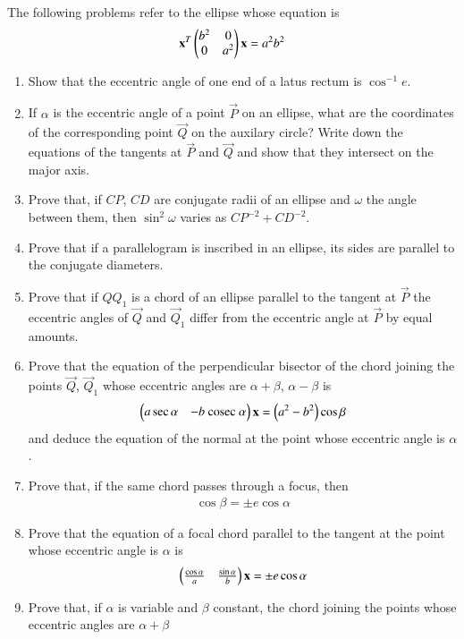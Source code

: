 \renewcommand{\theequation}{\theenumi}
The following problems refer to the ellipse whose 
equation is
\begin{align}
\mathbf{x}^T\begin{pmatrix}b^2 & 0\\0 & a^2\end{pmatrix}\mathbf{x} =a^2b^2
\end{align}
\begin{enumerate}[label=\arabic*.,ref=\thesubsection.\theenumi]
\item Show that the eccentric angle of one end of a latus rectum is $\cos^{-1}e$.
\item If $\alpha$ is the eccentric angle of a point $\vec{P}$ on an ellipse, what are the coordinates of the
corresponding point $\vec{Q}$ on the auxilary circle?
Write down the equations of the tangents at $\vec{P}$ and $\vec{Q}$ and show that they intersect on the major axis.
\item Prove that, if $CP$, $CD$ are conjugate radii of an ellipse and $\omega$ the angle between them, then
$\sin^{2}\omega$ varies as $CP^{-2}+CD^{-2}$.
\item Prove that if a parallelogram is inscribed in an ellipse, its sides are parallel to 
the conjugate diameters.
\item Prove that if $QQ_1$ is a chord of an ellipse parallel to the tangent at $\vec{P}$ the eccentric angles
of $\vec{Q}$ and $\vec{Q}_1$ differ from the eccentric angle at $\vec{P}$ by equal amounts.
\item Prove that the equation of the perpendicular bisector of the chord joining the points $\vec{Q}$, $\vec{Q}_1$ whose
eccentric angles are $\alpha+\beta$, $\alpha-\beta$ is 
\begin{align}
\begin{pmatrix}a\sec \alpha & -b\text{ cosec } \alpha\end{pmatrix}\mathbf{x} = \left(a^2-b^2\right)\cos\beta
\end{align}
and deduce the equation of the normal at the point whose eccentric angle is $\alpha$.
\item Prove that, if the same chord passes through a focus, then
\begin{align}
\cos\beta = \pm e \cos\alpha
\end{align}
\item Prove that the equation of a focal chord parallel to the tangent at the point whose
eccentric angle is $\alpha$ is
\begin{align}
\begin{pmatrix}\frac{\cos\alpha}{a}  & \frac{\sin\alpha}{b}\end{pmatrix}\mathbf{x} = \pm e \cos\alpha
\end{align}
\item Prove that, if $\alpha$ is variable and $\beta$ constant, the chord joining the points whose eccentric angles are $\alpha+\beta$

\end{enumerate}
